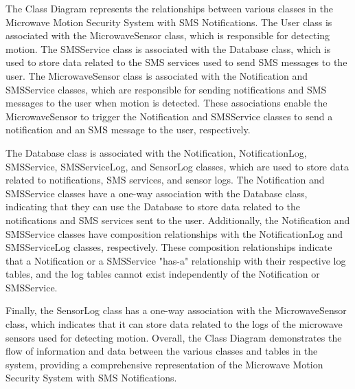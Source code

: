 \documentclass[conference]{IEEEtran}
\begin{document}
The Class Diagram represents the relationships between various classes in the
Microwave Motion Security System with SMS Notifications. The User class is associated
with the MicrowaveSensor class, which is responsible for detecting motion.
The SMSService class is associated with the Database class, which is used to store
data related to the SMS services used to send SMS messages to the user.
The MicrowaveSensor class is associated with the Notification and SMSService classes,
which are responsible for sending notifications and SMS messages to the user when
motion is detected. These associations enable the MicrowaveSensor to trigger the
Notification and SMSService classes to send a notification and an SMS message
to the user, respectively.

The Database class is associated with the Notification, NotificationLog, SMSService,
SMSServiceLog, and SensorLog classes, which are used to store data related to
notifications, SMS services, and sensor logs. The Notification and SMSService
classes have a one-way association with the Database class, indicating that they
can use the Database to store data related to the notifications and SMS services
sent to the user. Additionally, the Notification and SMSService classes have
composition relationships with the NotificationLog and SMSServiceLog classes, respectively.
These composition relationships indicate that a Notification or a SMSService "has-a"
relationship with their respective log tables, and the log tables cannot exist
independently of the Notification or SMSService.

Finally, the SensorLog class has a one-way association with the MicrowaveSensor class,
which indicates that it can store data related to the logs of the microwave sensors
used for detecting motion. Overall, the Class Diagram demonstrates the flow of
information and data between the various classes and tables in the system, providing a
comprehensive representation of the Microwave Motion Security System with
SMS Notifications.
\end{document}
